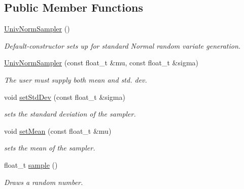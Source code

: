 \subsection*{Public Member Functions}
\begin{DoxyCompactItemize}
\item 
\mbox{\label{classrvsamp_1_1UnivNormSampler_ade55cded90f94c26d4dfc309cf894a37}} 
\hyperlink{classrvsamp_1_1UnivNormSampler_ade55cded90f94c26d4dfc309cf894a37}{Univ\+Norm\+Sampler} ()
\begin{DoxyCompactList}\small\item\em Default-\/constructor sets up for standard Normal random variate generation. \end{DoxyCompactList}\item 
\hyperlink{classrvsamp_1_1UnivNormSampler_abf9480e20a20e83f35933dcad1360117}{Univ\+Norm\+Sampler} (const float\+\_\+t \&mu, const float\+\_\+t \&sigma)
\begin{DoxyCompactList}\small\item\em The user must supply both mean and std. dev. \end{DoxyCompactList}\item 
void \hyperlink{classrvsamp_1_1UnivNormSampler_a77923ac7ff44866f2d6b50e75d97d119}{set\+Std\+Dev} (const float\+\_\+t \&sigma)
\begin{DoxyCompactList}\small\item\em sets the standard deviation of the sampler. \end{DoxyCompactList}\item 
void \hyperlink{classrvsamp_1_1UnivNormSampler_a9f9281d2cd88d82d251686ea9b9d4182}{set\+Mean} (const float\+\_\+t \&mu)
\begin{DoxyCompactList}\small\item\em sets the mean of the sampler. \end{DoxyCompactList}\item 
float\+\_\+t \hyperlink{classrvsamp_1_1UnivNormSampler_a67416efdbb1569a068d5a5a4914e27a1}{sample} ()
\begin{DoxyCompactList}\small\item\em Draws a random number. \end{DoxyCompactList}\end{DoxyCompactItemize}
